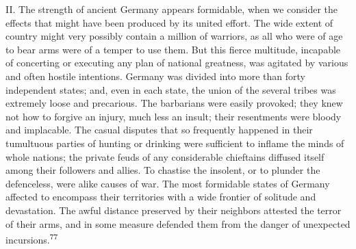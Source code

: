 
II. The strength of ancient Germany appears formidable, when we
consider the effects that might have been produced by its united
effort. The wide extent of country might very possibly contain a
million of warriors, as all who were of age to bear arms were of
a temper to use them. But this fierce multitude, incapable of
concerting or executing any plan of national greatness, was
agitated by various and often hostile intentions. Germany was
divided into more than forty independent states; and, even in
each state, the union of the several tribes was extremely loose
and precarious. The barbarians were easily provoked; they knew
not how to forgive an injury, much less an insult; their
resentments were bloody and implacable. The casual disputes that
so frequently happened in their tumultuous parties of hunting or
drinking were sufficient to inflame the minds of whole nations;
the private feuds of any considerable chieftains diffused itself
among their followers and allies. To chastise the insolent, or to
plunder the defenceless, were alike causes of war. The most
formidable states of Germany affected to encompass their
territories with a wide frontier of solitude and devastation. The
awful distance preserved by their neighbors attested the terror
of their arms, and in some measure defended them from the danger
of unexpected incursions.\textsuperscript{77}



